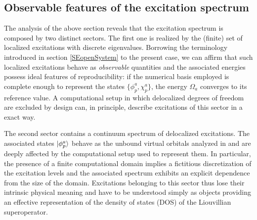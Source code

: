 \documentclass[reprint,aps,prb]{revtex4-1}
\begin{document}
\subsection{Observable features of the excitation spectrum}

The analysis of the above section reveals that the excitation spectrum is composed by two distinct sectors.
The first one is realized by the (finite) set of localized excitations with discrete eigenvalues.
Borrowing the terminology introduced in section \ref{SEopenSystem} to the present case, we can affirm that such localized excitations behave as
\emph{observable} quantities and the associated energies possess ideal features of reproducibility:
if the numerical basis employed is complete enough to
represent the states $\{\phi_p^a,\chi_p^a\}$, the energy $\Omega_a$
converges to its reference value.
A computational setup in which delocalized degrees of freedom are excluded by design can, in principle, describe excitations of this sector in a exact way.

The second sector contains a continuum spectrum of delocalized excitations. The associated states $\ket{\phi_p^a}$ behave as the unbound virtual orbitals analyzed in \cite{boffi2016}
and are deeply affected by the computational setup used to represent them. In particular, the presence of a finite computational domain implies a fictitious discretization of the excitation levels and
the associated spectrum exhibits an explicit dependence from the size of the domain.
Excitations belonging to this sector thus lose their intrinsic physical meaning and have to be understood simply as objects providing an effective representation of the density of states (DOS) of the Liouvillian superoperator.
\end{document}
